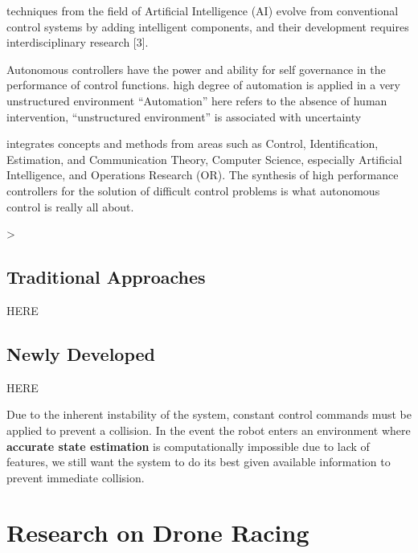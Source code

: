 techniques  from  the  field  of  Artificial  Intelligence  (AI)  
    evolve  from  conventional  control  systems  by  adding  intelligent  components,  and  their  development requires interdisciplinary research [3]. 

Autonomous  controllers  have  the  power  and  ability  for  self  governance  in  the  performance  of  control  functions.
high  degree   of   automation   is   applied   in   a   very   unstructured   environment
“Automation”  here  refers  to  the  absence  of  human   intervention,
“unstructured   environment”   is   associated with uncertainty

integrates concepts and methods from areas such as Control, Identification,   Estimation,   and   Communication   Theory,   Computer   Science,   especially   Artificial   Intelligence,   and   Operations  Research  (OR).  
The   synthesis   of   high   performance   controllers  for  the  solution  of  difficult  control  problems  is  what autonomous control is really all about.  

>

\subsection{Traditional Approaches}

HERE


\subsection{Newly Developed}
HERE


Due to the inherent instability of the system, constant control commands must be applied to
prevent a collision. In the event the robot enters an environment where \textbf{accurate state estimation}
is computationally impossible due to lack of features, we still want the system to do its best given
available information to prevent immediate collision.














\section{Research on Drone Racing}


